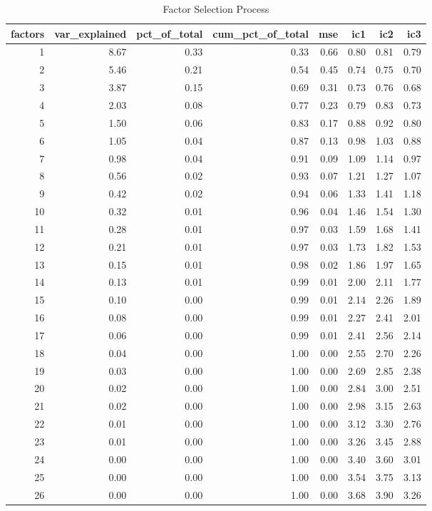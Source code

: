 \documentclass[11pt, letterpaper]{article}\usepackage[]{graphicx}\usepackage[]{color}
\begin{document}
\begin{table}[!h]
\centering
\begingroup\footnotesize
\begin{tabular}{rrrrrrrr}
  \hline
factors & var\_explained & pct\_of\_total & cum\_pct\_of\_total & mse & ic1 & ic2 & ic3 \\ 
  \hline
  1 & 8.67 & 0.33 & 0.33 & 0.66 & 0.80 & 0.81 & 0.79 \\ 
    2 & 5.46 & 0.21 & 0.54 & 0.45 & 0.74 & 0.75 & 0.70 \\ 
    3 & 3.87 & 0.15 & 0.69 & 0.31 & 0.73 & 0.76 & 0.68 \\ 
    4 & 2.03 & 0.08 & 0.77 & 0.23 & 0.79 & 0.83 & 0.73 \\ 
    5 & 1.50 & 0.06 & 0.83 & 0.17 & 0.88 & 0.92 & 0.80 \\ 
    6 & 1.05 & 0.04 & 0.87 & 0.13 & 0.98 & 1.03 & 0.88 \\ 
    7 & 0.98 & 0.04 & 0.91 & 0.09 & 1.09 & 1.14 & 0.97 \\ 
    8 & 0.56 & 0.02 & 0.93 & 0.07 & 1.21 & 1.27 & 1.07 \\ 
    9 & 0.42 & 0.02 & 0.94 & 0.06 & 1.33 & 1.41 & 1.18 \\ 
   10 & 0.32 & 0.01 & 0.96 & 0.04 & 1.46 & 1.54 & 1.30 \\ 
   11 & 0.28 & 0.01 & 0.97 & 0.03 & 1.59 & 1.68 & 1.41 \\ 
   12 & 0.21 & 0.01 & 0.97 & 0.03 & 1.73 & 1.82 & 1.53 \\ 
   13 & 0.15 & 0.01 & 0.98 & 0.02 & 1.86 & 1.97 & 1.65 \\ 
   14 & 0.13 & 0.01 & 0.99 & 0.01 & 2.00 & 2.11 & 1.77 \\ 
   15 & 0.10 & 0.00 & 0.99 & 0.01 & 2.14 & 2.26 & 1.89 \\ 
   16 & 0.08 & 0.00 & 0.99 & 0.01 & 2.27 & 2.41 & 2.01 \\ 
   17 & 0.06 & 0.00 & 0.99 & 0.01 & 2.41 & 2.56 & 2.14 \\ 
   18 & 0.04 & 0.00 & 1.00 & 0.00 & 2.55 & 2.70 & 2.26 \\ 
   19 & 0.03 & 0.00 & 1.00 & 0.00 & 2.69 & 2.85 & 2.38 \\ 
   20 & 0.02 & 0.00 & 1.00 & 0.00 & 2.84 & 3.00 & 2.51 \\ 
   21 & 0.02 & 0.00 & 1.00 & 0.00 & 2.98 & 3.15 & 2.63 \\ 
   22 & 0.01 & 0.00 & 1.00 & 0.00 & 3.12 & 3.30 & 2.76 \\ 
   23 & 0.01 & 0.00 & 1.00 & 0.00 & 3.26 & 3.45 & 2.88 \\ 
   24 & 0.00 & 0.00 & 1.00 & 0.00 & 3.40 & 3.60 & 3.01 \\ 
   25 & 0.00 & 0.00 & 1.00 & 0.00 & 3.54 & 3.75 & 3.13 \\ 
   26 & 0.00 & 0.00 & 1.00 & 0.00 & 3.68 & 3.90 & 3.26 \\ 
   \hline
\end{tabular}
\endgroup
\caption{Factor Selection Process} 
\end{table}
\end{document}
